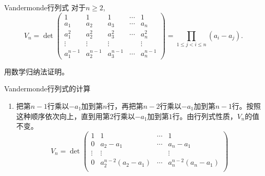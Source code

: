 \begin{frame}

\begin{block}{Vandermonde行列式}
对于$n\geqslant2$,
$$V_n = \det \begin{pmatrix}
1 & 1 & 1 & \cdots & 1 \\
a_1 & a_2 & a_3 & \cdots & a_n \\
a_1^2 & a_2^2 & a_3^2 & \cdots & a_n^2 \\
\vdots & \vdots & \vdots & & \vdots \\
a_1^{n-1} & a_2^{n-1} & a_3^{n-1} & \cdots & a_n^{n-1}
\end{pmatrix} = \prod_{1\leqslant j < i \leqslant n} (a_i - a_j).$$
\end{block}

\vspace{2em}
\pause

用数学归纳法证明。

\end{frame}


\begin{frame}

\begin{block}{Vandermonde行列式的计算}
\begin{enumerate}
\item 把第$n-1$行乘以$-a_1$加到第$n$行，再把第$n-2$行乘以$-a_1$加到第$n-1$行。按照这种顺序依次向上，直到用第$2$行乘以$-a_1$加到第$1$行。由行列式性质，$V_n$的值不变。
\[
V_n = \det \begin{pmatrix}
1 & 1 & \cdots & 1 \\
0 & a_2-a_1 & \cdots & a_n-a_1 \\
\vdots & \vdots & & \vdots \\
0 & a_2^{n-2}(a_2-a_1) & \cdots & a_n^{n-2}(a_n-a_1) \\
\end{pmatrix}
\]
\end{enumerate}
\end{block}

\end{frame}


